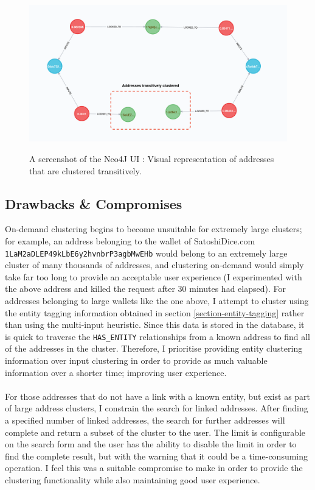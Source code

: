 \begin{figure}[h!]
  \centering
  \includegraphics[width = 15cm]{./figures/neo4j-screenshots/addresses-transitively-clustered}\\[0.5cm] 
  \caption{A screenshot of the Neo4J UI : Visual representation of addresses that are clustered transitively.}
  \label{fig:neo4j-transitive-clustering-screenshot}
\end{figure}

\subsection{Drawbacks \& Compromises}
On-demand clustering begins to become unsuitable for extremely large clusters; for example, an address belonging to the wallet of SatoshiDice.com \\\texttt{1LaM2aDLEP49kLbE6y2hvnbrP3agbMwEHb} would belong to an extremely large cluster of many thousands of addresses, and clustering on-demand would simply take far too long to provide an acceptable user experience (I experimented with the above address and killed the request after 30 minutes had elapsed). For addresses belonging to large wallets like the one above, I attempt to cluster using the entity tagging information obtained in section \ref{section-entity-tagging} rather than using the multi-input heuristic.
Since this data is stored in the database, it is quick to traverse the \texttt{HAS\_ENTITY} relationships from a known address to find all of the addresses in the cluster. Therefore, I prioritise providing entity clustering information over input clustering in order to provide as much valuable information over a shorter time; improving user experience. \\\\
For those addresses that do not have a link with a known entity, but exist as part of large address clusters, I constrain the search for linked addresses. After finding a specified number of linked addresses, the search for further addresses will complete and return a subset of the cluster to the user. The limit is configurable on the search form and the user has the ability to disable the limit in order to find the complete result, but with the warning that it could be a time-consuming operation. I feel this was a suitable compromise to make in order to provide the clustering functionality while also maintaining good user experience. 


